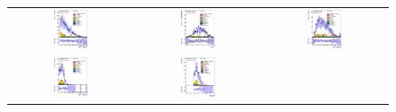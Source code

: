 \begin{figure}[h!]
\begin{center}
\begin{tabular}{ccc}
%
\includegraphics[width=0.30\textwidth]{appendices/figures/sdrs/LepPt_ELEMUONCR2_1W_NOMINAL.eps} &
\includegraphics[width=0.30\textwidth]{appendices/figures/sdrs/LepEta_ELEMUONCR2_1W_NOMINAL.eps} &
\includegraphics[width=0.30\textwidth]{appendices/figures/sdrs/MET_ELEMUONCR2_1W_NOMINAL.eps} \\
\includegraphics[width=0.30\textwidth]{appendices/figures/sdrs/Wlep_MassT_ELEMUONCR2_1W_NOMINAL.eps} &
\includegraphics[width=0.30\textwidth]{appendices/figures/sdrs/Njets25_ELEMUONCR2_1W_NOMINAL.eps}  &

\end{tabular}
\end{center}
\end{figure}
